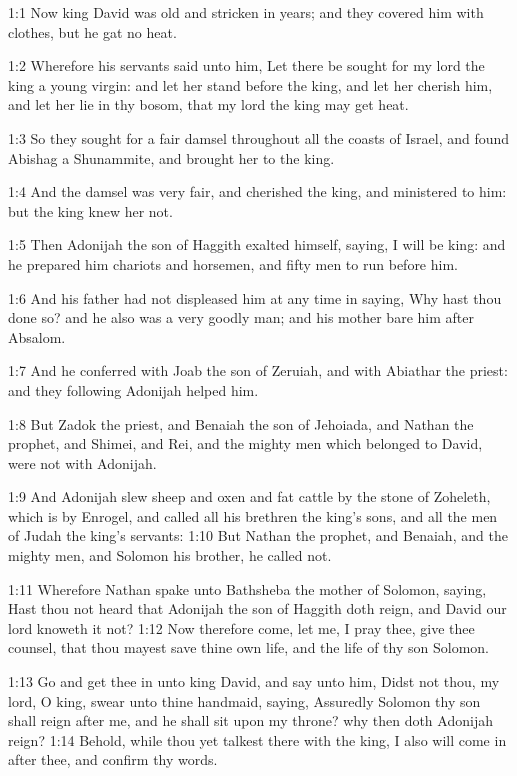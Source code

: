 
1:1 Now king David was old and stricken in years; and they covered him with clothes, but he gat no heat.

1:2 Wherefore his servants said unto him, Let there be sought for my lord the king a young virgin: and let her stand before the king, and let her cherish him, and let her lie in thy bosom, that my lord the king may get heat.

1:3 So they sought for a fair damsel throughout all the coasts of Israel, and found Abishag a Shunammite, and brought her to the king.

1:4 And the damsel was very fair, and cherished the king, and ministered to him: but the king knew her not.

1:5 Then Adonijah the son of Haggith exalted himself, saying, I will be king: and he prepared him chariots and horsemen, and fifty men to run before him.

1:6 And his father had not displeased him at any time in saying, Why hast thou done so? and he also was a very goodly man; and his mother bare him after Absalom.

1:7 And he conferred with Joab the son of Zeruiah, and with Abiathar the priest: and they following Adonijah helped him.

1:8 But Zadok the priest, and Benaiah the son of Jehoiada, and Nathan the prophet, and Shimei, and Rei, and the mighty men which belonged to David, were not with Adonijah.

1:9 And Adonijah slew sheep and oxen and fat cattle by the stone of Zoheleth, which is by Enrogel, and called all his brethren the king's sons, and all the men of Judah the king's servants: 1:10 But Nathan the prophet, and Benaiah, and the mighty men, and Solomon his brother, he called not.

1:11 Wherefore Nathan spake unto Bathsheba the mother of Solomon, saying, Hast thou not heard that Adonijah the son of Haggith doth reign, and David our lord knoweth it not?  1:12 Now therefore come, let me, I pray thee, give thee counsel, that thou mayest save thine own life, and the life of thy son Solomon.

1:13 Go and get thee in unto king David, and say unto him, Didst not thou, my lord, O king, swear unto thine handmaid, saying, Assuredly Solomon thy son shall reign after me, and he shall sit upon my throne?  why then doth Adonijah reign?  1:14 Behold, while thou yet talkest there with the king, I also will come in after thee, and confirm thy words.

